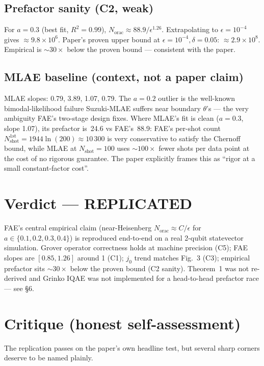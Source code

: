 \documentclass[11pt]{article}
\begin{document}
\subsection{Prefactor sanity (C2, weak)}
For $a = 0.3$ (best fit, $R^{2} = 0.99$), $N_{\mathrm{orac}} \approx 88.9/\epsilon^{1.26}$. Extrapolating to $\epsilon = 10^{-4}$ gives $\approx 9.8\times 10^{6}$. Paper's proven upper bound at $\epsilon = 10^{-4}, \delta = 0.05$: $\approx 2.9\times 10^{8}$. Empirical is $\sim 30\times$ below the proven bound --- consistent with the paper.

\subsection{MLAE baseline (context, not a paper claim)}
MLAE slopes: 0.79, 3.89, 1.07, 0.79. The $a = 0.2$ outlier is the well-known bimodal-likelihood failure Suzuki-MLAE suffers near boundary $\theta$'s --- the very ambiguity FAE's two-stage design fixes. Where MLAE's fit is clean ($a=0.3$, slope 1.07), its prefactor is~24.6 vs FAE's~88.9: FAE's per-shot count $N_{\mathrm{shot}}^{1\mathrm{st}} = 1944\ln(200) \approx 10\,300$ is very conservative to satisfy the Chernoff bound, while MLAE at $N_{\mathrm{shot}} = 100$ uses $\sim 100\times$ fewer shots per data point at the cost of no rigorous guarantee. The paper explicitly frames this as ``rigor at a small constant-factor cost''.

\section{Verdict --- REPLICATED}

FAE's central empirical claim (near-Heisenberg $N_{\mathrm{orac}} \approx C/\epsilon$ for $a \in \{0.1, 0.2, 0.3, 0.4\}$) is reproduced end-to-end on a real 2-qubit statevector simulation. Grover operator correctness holds at machine precision (C5); FAE slopes are $[0.85, 1.26]$ around 1 (C1); $j_{0}$ trend matches Fig.~3 (C3); empirical prefactor sits $\sim 30\times$ below the proven bound (C2 sanity). Theorem~1 was not re-derived and Grinko IQAE was not implemented for a head-to-head prefactor race --- see \S6.

\section{Critique (honest self-assessment)}

The replication passes on the paper's own headline test, but several sharp corners deserve to be named plainly.
\end{document}
